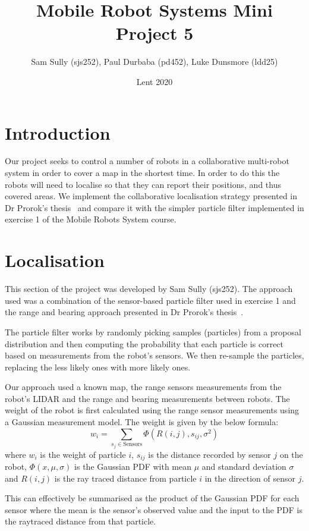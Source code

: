 \documentclass[10pt,a4paper]{article}
\begin{document}
\twocolumn
\title{Mobile Robot Systems Mini Project 5}
\author{Sam Sully (sjs252), Paul Durbaba (pd452), Luke Dunsmore (ldd25)}
\date{Lent 2020}
\maketitle
\section{Introduction}
Our project seeks to control a number of robots in a collaborative multi-robot system in order to cover a map in the shortest time. In order to do this the robots will need to localise so that they can report their positions, and thus covered areas. We implement the collaborative localisation strategy presented in Dr Prorok's thesis~\cite{prorok} and compare it with the simpler particle filter implemented in exercise 1 of the Mobile Robots System course.
\section{Localisation}
This section of the project was developed by Sam Sully (sjs252). The approach used was a combination of the sensor-based particle filter used in exercise 1 and the range and bearing approach presented in Dr Prorok's thesis~\cite{prorok}.

The particle filter works by randomly picking samples (particles) from a proposal distribution and then computing the probability that each particle is correct based on measurements from the robot's sensors. We then re-sample the particles, replacing the less likely ones with more likely ones.

Our approach used a known map, the range sensors measurements from the robot's LIDAR and the range and bearing measurements between robots. The weight of the robot is first calculated using the range sensor measurements using a Gaussian measurement model. The weight is given by the below formula:
\[
	w_i = \sum_{s_{j} \in \mathrm{Sensors}}\Phi(R(i,j), s_{ij}, \sigma^2)
\]
where $w_i$ is the weight of particle $i$, $s_{ij}$ is the distance recorded by sensor $j$ on the robot, $\Phi(x,\mu,\sigma)$ is the Gaussian PDF with mean $\mu$ and standard deviation $\sigma$ and $R(i,j)$ is the ray traced distance from particle $i$ in the direction of sensor $j$.

This can effectively be summarised as the product of the Gaussian PDF for each sensor where the mean is the sensor's observed value and the input to the PDF is the raytraced distance from that particle.
\end{document}
